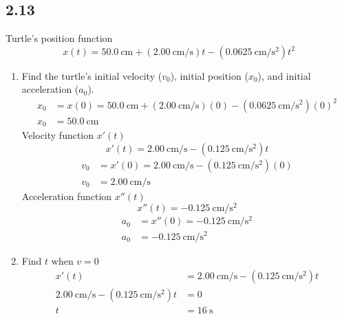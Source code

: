 \documentclass{article}
\begin{document}
\subsection{2.13}
Turtle's position function
$$ x(t) = \SI{50.0}{\centi \meter} + (\SI{2.00}{\centi \meter \per \second})t - (\SI{0.0625}{\centi \meter \per \second \squared})t^2 $$
\begin{enumerate}[label=\textbf{(\alph*)}]
	\item
		Find the turtle's initial velocity ($ v_0 $), initial position ($ x_0 $), and initial acceleration ($ a_0 $).
		\begin{align*}
			x_0 & = x(0) = \SI{50.0}{\centi \meter} + (\SI{2.00}{\centi \meter \per \second})(0) - (\SI{0.0625}{\centi \meter \per \second \squared})(0)^2 \\
			x_0 & = \SI{50.0}{\centi \meter}
		\end{align*}
		Velocity function $ x'(t) $
		\begin{equation*}
			x'(t) = \SI{2.00}{\centi \meter \per \second} - (\SI{0.125}{\centi \meter \per \second \squared})t
		\end{equation*}
		\begin{align*}
			v_0 & = x'(0) = \SI{2.00}{\centi \meter \per \second} - (\SI{0.125}{\centi \meter \per \second \squared})(0) \\
			v_0 & = \SI{2.00}{\centi \meter \per \second}
		\end{align*}
		Acceleration function $ x''(t) $
		\begin{equation*}
			x''(t) = \SI{-0.125}{\centi \meter \per \second \squared}
		\end{equation*}
		\begin{align*}
			a_0 & = x''(0) = \SI{-0.125}{\centi \meter \per \second \squared} \\
			a_0 & = \SI{-0.125}{\centi \meter \per \second \squared}
		\end{align*}
	\item
		Find $ t $ when $ v = 0 $
		\begin{align*}
			x'(t) & = \SI{2.00}{\centi \meter \per \second} - (\SI{0.125}{\centi \meter \per \second \squared})t \\
			\SI{2.00}{\centi \meter \per \second} - (\SI{0.125}{\centi \meter \per \second \squared})t & = 0 \\
			t & = \SI{16}{\second}
		\end{align*}

\end{enumerate}
\end{document}

